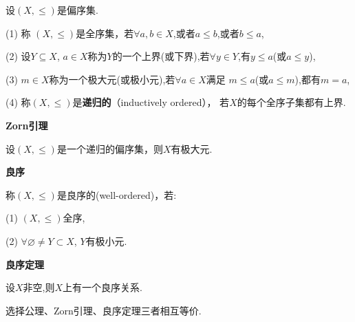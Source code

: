	\begin{definition}
        设$(X,\leqslant)$是偏序集.\par
            \qquad (1) 称 $(X,\leqslant)$是全序集，若$\forall a,b \in X$,或者$a\leqslant b$,或者$b\leqslant a$, \par
            \qquad (2) 设$Y \subseteq X$, $a \in X$称为$Y$的一个上界(或下界),若$\forall y \in Y$,有$y \leqslant a$(或$a\leqslant y$), \par
            \qquad (3) $m \in X$称为一个极大元(或极小元),若$\forall a \in X$满足 $m \leqslant a$(或$a \leqslant m$),都有$m=a$, \par
            \qquad (4) 称$(X,\leqslant)$是\textbf{递归的}（inductively ordered），
            若$X$的每个全序子集都有上界.
    \end{definition}

	\begin{theorem} \textbf{Zorn引理}\par
        设$(X,\leqslant)$是一个递归的偏序集，则$X$有极大元.

    \end{theorem}

	\begin{definition} \textbf{良序}\par
		称$(X,\leqslant)$是良序的(well-ordered)，若: \par
            \qquad (1) $(X,\leqslant)$全序, \par
            \qquad (2) $\forall \varnothing \neq Y \subset X$, $Y$有极小元.

    \end{definition}

	\begin{theorem} \textbf{良序定理}\par
		设$X$非空,则$X$上有一个良序关系.
	\end{theorem}

	\begin{theorem}
        选择公理、Zorn引理、良序定理三者相互等价.
    \end{theorem}

